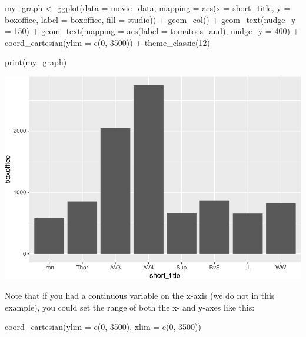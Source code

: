 \documentclass[
]{krantz}
\makeatletter
\newenvironment{Shaded}{\begin{snugshade}}{\end{snugshade}}
\newcommand{\AttributeTok}[1]{\textcolor[rgb]{0.61,0.61,0.61}{#1}}
\newcommand{\DecValTok}[1]{\textcolor[rgb]{0.06,0.06,0.06}{#1}}
\newcommand{\FunctionTok}[1]{\textcolor[rgb]{0,0,0}{#1}}
\newcommand{\NormalTok}[1]{#1}
\newcommand{\OtherTok}[1]{\textcolor[rgb]{0.37,0.37,0.37}{#1}}
\newcommand{\SpecialCharTok}[1]{\textcolor[rgb]{0,0,0}{#1}}
\newenvironment{kframe}{%
\medskip{}
\setlength{\fboxsep}{.8em}
 \def\at@end@of@kframe{}%
 \ifinner\ifhmode%
  \def\at@end@of@kframe{\end{minipage}}%
  \begin{minipage}{\columnwidth}%
 \fi\fi%
 \def\FrameCommand##1{\hskip\@totalleftmargin \hskip-\fboxsep
 \colorbox{shadecolor}{##1}\hskip-\fboxsep
     \hskip-\linewidth \hskip-\@totalleftmargin \hskip\columnwidth}%
 \MakeFramed {\advance\hsize-\width
   \@totalleftmargin\z@ \linewidth\hsize
   \@setminipage}}%
 {\par\unskip\endMakeFramed%
 \at@end@of@kframe}
\renewenvironment{Shaded}{\begin{kframe}}{\end{kframe}}
\makeatother
\begin{document}
\begin{Shaded}
\begin{Highlighting}[]
\NormalTok{my\_graph }\OtherTok{\textless{}{-}} \FunctionTok{ggplot}\NormalTok{(}\AttributeTok{data =}\NormalTok{ movie\_data,}
           \AttributeTok{mapping =} \FunctionTok{aes}\NormalTok{(}\AttributeTok{x =}\NormalTok{ short\_title,}
                         \AttributeTok{y =}\NormalTok{ boxoffice,}
                         \AttributeTok{label =}\NormalTok{ boxoffice, }
                         \AttributeTok{fill =}\NormalTok{ studio)) }\SpecialCharTok{+}
  \FunctionTok{geom\_col}\NormalTok{() }\SpecialCharTok{+}
  \FunctionTok{geom\_text}\NormalTok{(}\AttributeTok{nudge\_y =} \DecValTok{150}\NormalTok{)  }\SpecialCharTok{+}
  \FunctionTok{geom\_text}\NormalTok{(}\AttributeTok{mapping =} \FunctionTok{aes}\NormalTok{(}\AttributeTok{label =}\NormalTok{ tomatoes\_aud), }
            \AttributeTok{nudge\_y =} \DecValTok{400}\NormalTok{) }\SpecialCharTok{+}
  \FunctionTok{coord\_cartesian}\NormalTok{(}\AttributeTok{ylim =} \FunctionTok{c}\NormalTok{(}\DecValTok{0}\NormalTok{, }\DecValTok{3500}\NormalTok{)) }\SpecialCharTok{+}
  \FunctionTok{theme\_classic}\NormalTok{(}\DecValTok{12}\NormalTok{)}


\FunctionTok{print}\NormalTok{(my\_graph)}
\end{Highlighting}
\end{Shaded}

\includegraphics[width=0.65\linewidth]{bookdown_files/figure-latex/unnamed-chunk-109-1}

Note that if you had a continuous variable on the x-axis (we do not in this example), you could set the range of both the x- and y-axes like this:

\begin{Shaded}
\begin{Highlighting}[]
\FunctionTok{coord\_cartesian}\NormalTok{(}\AttributeTok{ylim =} \FunctionTok{c}\NormalTok{(}\DecValTok{0}\NormalTok{, }\DecValTok{3500}\NormalTok{),}
                \AttributeTok{xlim =} \FunctionTok{c}\NormalTok{(}\DecValTok{0}\NormalTok{, }\DecValTok{3500}\NormalTok{))}
\end{Highlighting}
\end{Shaded}
\end{document}
